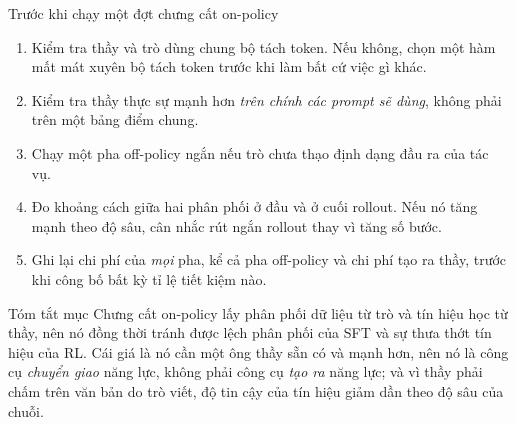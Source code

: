 \begin{checklist}{Trước khi chạy một đợt chưng cất on-policy}
\begin{enumerate}
	\item Kiểm tra thầy và trò dùng chung bộ tách token. Nếu không, chọn một hàm mất mát xuyên bộ tách token trước khi làm bất cứ việc gì khác.
	\item Kiểm tra thầy thực sự mạnh hơn \emph{trên chính các prompt sẽ dùng}, không phải trên một bảng điểm chung.
	\item Chạy một pha off-policy ngắn nếu trò chưa thạo định dạng đầu ra của tác vụ.
	\item Đo khoảng cách giữa hai phân phối ở đầu và ở cuối rollout. Nếu nó tăng mạnh theo độ sâu, cân nhắc rút ngắn rollout thay vì tăng số bước.
	\item Ghi lại chi phí của \emph{mọi} pha, kể cả pha off-policy và chi phí tạo ra thầy, trước khi công bố bất kỳ tỉ lệ tiết kiệm nào.
\end{enumerate}
\end{checklist}

\begin{keyidea}{Tóm tắt mục}
Chưng cất on-policy lấy phân phối dữ liệu từ trò và tín hiệu học từ thầy, nên nó đồng thời tránh được lệch phân phối của SFT và sự thưa thớt tín hiệu của RL. Cái giá là nó cần một ông thầy sẵn có và mạnh hơn, nên nó là công cụ \emph{chuyển giao} năng lực, không phải công cụ \emph{tạo ra} năng lực; và vì thầy phải chấm trên văn bản do trò viết, độ tin cậy của tín hiệu giảm dần theo độ sâu của chuỗi.
\end{keyidea}
